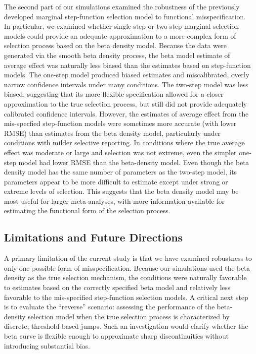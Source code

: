 \documentclass[
  american,
  man, donotrepeattitle,floatsintext]{apa7}
\begin{document}
The second part of our simulations examined the robustness of the previously developed marginal step-function selection model to functional misspecification.
In particular, we examined whether single-step or two-step marginal selection models could provide an adequate approximation to a more complex form of selection process based on the beta density model.
Because the data were generated via the smooth beta density process, the beta model estimate of average effect was naturally less biased than the estimates based on step-function models.
The one-step model produced biased estimates and miscalibrated, overly narrow confidence intervals under many conditions.
The two-step model was less biased, suggesting that its more flexible specification allowed for a closer approximation to the true selection process, but still did not provide adequately calibrated confidence intervals.
However, the estimates of average effect from the mis-specfied step-function models were sometimes more accurate (with lower RMSE) than estimates from the beta density model, particularly under conditions with milder selective reporting.
In conditions where the true average effect was moderate or large and selection was not extreme, even the simpler one-step model had lower RMSE than the beta-density model.
Even though the beta density model has the same number of parameters as the two-step model, its parameters appear to be more difficult to estimate except under strong or extreme levels of selection.
This suggests that the beta density model may be most useful for larger meta-analyses, with more information available for estimating the functional form of the selection process.

\subsection{Limitations and Future Directions}\label{limitations-and-future-directions}

A primary limitation of the current study is that we have examined robustness to only one possible form of misspecification.
Because our simulations used the beta density as the true selection mechanism, the conditions were naturally favorable to estimates based on the correctly specified beta model and relatively less favorable to the mis-specified step-function selection models.
A critical next step is to evaluate the ``reverse'' scenario: assessing the performance of the beta-density selection model when the true selection process is characterized by discrete, threshold-based jumps.
Such an investigation would clarify whether the beta curve is flexible enough to approximate sharp discontinuities without introducing substantial bias.
\end{document}
